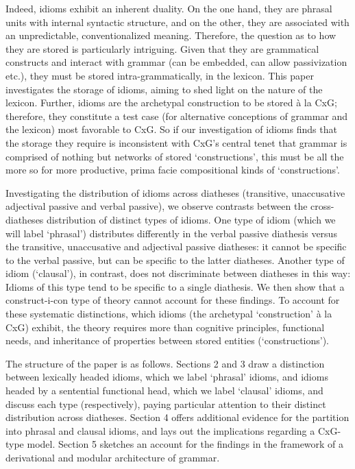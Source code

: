 \documentclass[output=paper,
modfonts
]{LSP/langsci}
\begin{document}
Indeed, idioms exhibit an inherent duality. On the one hand, they are
phrasal units with internal syntactic structure, and on the other, they
are associated with an unpredictable, conventionalized meaning.
Therefore, the question as to how they are stored is particularly
intriguing. Given that they are grammatical constructs and interact with
grammar (can be embedded, can allow passivization etc.), they must be
stored intra-grammatically, in the lexicon. This paper investigates the
storage of idioms, aiming to shed light on the nature of the lexicon.
Further, idioms are the archetypal construction to be stored à la CxG;
therefore, they constitute a test case (for alternative conceptions of
grammar and the lexicon) most favorable to CxG. So if our investigation
of idioms finds that the storage they require is inconsistent with CxG's
central tenet that grammar is comprised of nothing but networks of
stored `constructions', this must be all the more so for more
productive, prima facie compositional kinds of `constructions'.

Investigating the distribution of idioms across diatheses (transitive,
unaccusative adjectival passive and verbal passive), we observe
contrasts between the cross-diatheses distribution of distinct types of
idioms. One type of idiom (which we will label `phrasal') distributes
differently in the verbal passive diathesis versus the transitive,
unaccusative and adjectival passive diatheses: it cannot be specific to
the verbal passive, but can be specific to the latter diatheses. Another
type of idiom (`clausal'), in contrast, does not discriminate between
diatheses in this way: Idioms of this type tend to be specific to a
single diathesis. We then show that a construct-i-con type of theory
cannot account for these findings. To account for these systematic
distinctions, which idioms (the archetypal `construction' à la CxG)
exhibit, the theory requires more than cognitive principles, functional
needs, and inheritance of properties between stored entities
(`constructions').

The structure of the paper is as follows. Sections 2 and 3 draw a
distinction between lexically headed idioms, which we label `phrasal'
idioms, and idioms headed by a sentential functional head, which we
label `clausal' idioms, and discuss each type (respectively), paying
particular attention to their distinct distribution across diatheses.
Section 4 offers additional evidence for the partition into phrasal and
clausal idioms, and lays out the implications regarding a CxG-type
model. Section 5 sketches an account for the findings in the framework
of a derivational and modular architecture of grammar.
\end{document}
